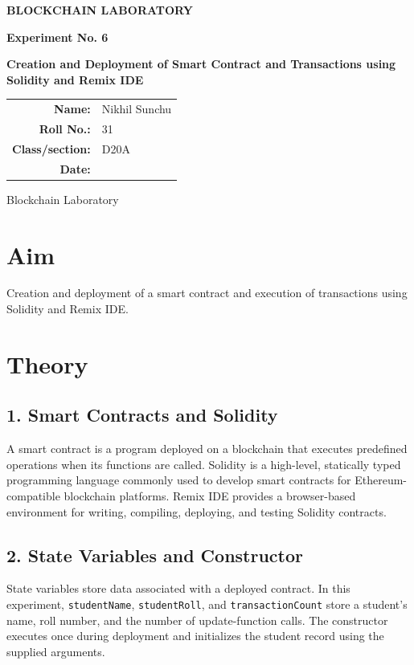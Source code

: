 \documentclass[12pt,a4paper]{article}
\begin{document}
\begin{titlepage}
\centering
\vspace*{1.5cm}
{\Large\bfseries BLOCKCHAIN LABORATORY\par}
\vspace{1.2cm}
{\large\bfseries Experiment No. 6\par}
\vspace{0.8cm}
{\LARGE\bfseries Creation and Deployment of Smart Contract and Transactions using Solidity and Remix IDE\par}
\vspace{1.5cm}
\begin{tabular}{rl}
\textbf{Name:} & Nikhil Sunchu \\[0.6cm]
\textbf{Roll No.:} & 31 \\[0.6cm]
\textbf{Class/section:} & D20A \\[0.6cm]
\textbf{Date:} & \hrulefill \\[0.6cm]
\end{tabular}
\vfill
{\large Blockchain Laboratory\par}
\end{titlepage}

\section{Aim}
Creation and deployment of a smart contract and execution of transactions using Solidity and Remix IDE.

\section{Theory}
\subsection{1. Smart Contracts and Solidity}
A smart contract is a program deployed on a blockchain that executes predefined operations when its functions are called. Solidity is a high-level, statically typed programming language commonly used to develop smart contracts for Ethereum-compatible blockchain platforms. Remix IDE provides a browser-based environment for writing, compiling, deploying, and testing Solidity contracts.

\subsection{2. State Variables and Constructor}
State variables store data associated with a deployed contract. In this experiment, \texttt{studentName}, \texttt{studentRoll}, and \texttt{transactionCount} store a student's name, roll number, and the number of update-function calls. The constructor executes once during deployment and initializes the student record using the supplied arguments.
\end{document}
